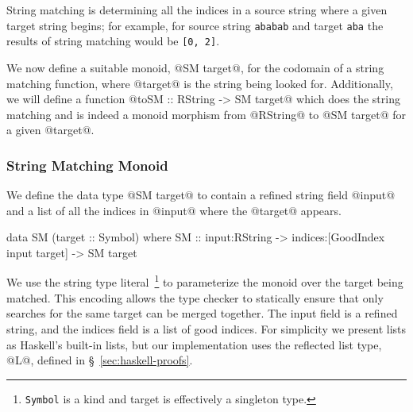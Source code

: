 String matching is determining all the indices in a source string
where a given target string begins; for example, for source string
\texttt{ababab} and target \texttt{aba} the results of string
matching would be \texttt{[0, 2]}. 

We now define a suitable monoid, @SM target@, for the codomain of
a string matching function, where @target@ is the string being looked
for.
%
Additionally, we will define a function @toSM :: RString -> SM target@
which does the string matching and is indeed a monoid morphism from
@RString@ to @SM target@ for a given @target@.

\subsubsection{String Matching Monoid}

We define the data type
@SM target@ to contain a refined string field @input@ and
a list of all the indices in @input@ where the
@target@ appears.
%
\begin{code}
data SM (target :: Symbol) where
  SM :: input:RString
     -> indices:[GoodIndex input target]
     -> SM target
\end{code}
%
We use the string type literal~\footnote{\texttt{Symbol} is a kind and
target is effectively a singleton type.} to parameterize the monoid
over the target being matched. This encoding allows the type checker
to statically ensure that only searches for the same target can be
merged together.  The input field is a refined string, and the indices
field is a list of good indices.  For simplicity we present lists as
Haskell's built-in lists, but our implementation uses the reflected
list type, @L@, defined in \S~\ref{sec:haskell-proofs}.

